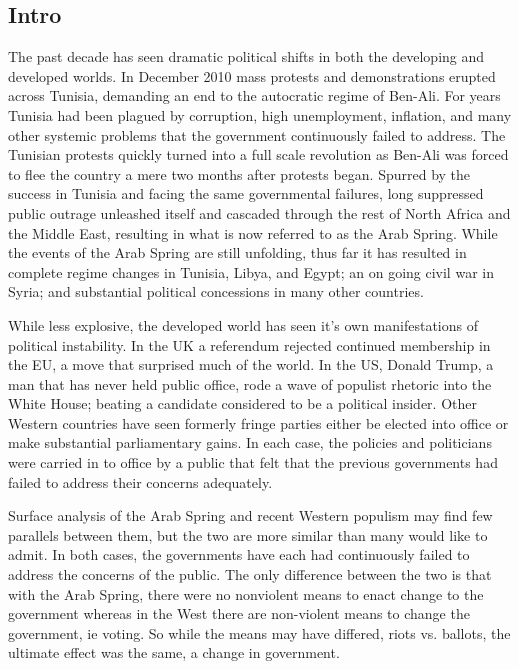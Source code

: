 \documentclass[12pt]{article}
\begin{document}
\begin{spacing}{1.5}


\section{Intro}

The past decade has seen dramatic political shifts in both the developing and developed worlds. In December 2010 mass protests and demonstrations erupted across Tunisia, demanding an end to the autocratic regime of Ben-Ali. For years Tunisia had been plagued by corruption, high unemployment, inflation, and many other systemic problems that the government continuously failed to address. The Tunisian protests quickly turned into a full scale revolution as Ben-Ali was forced to flee the country a mere two months after protests began. Spurred by the success in Tunisia and facing the same governmental failures, long suppressed public outrage unleashed itself and cascaded through the rest of North Africa and the Middle East, resulting in what is now referred to as the Arab Spring. While the events of the Arab Spring are still unfolding, thus far it has resulted in complete regime changes in Tunisia, Libya, and Egypt; an on going civil war in Syria; and substantial political concessions in many other countries.  

While less explosive, the developed world has seen it's own manifestations of political instability. In the UK a referendum rejected continued membership in the EU, a move that surprised much of the world. In the US, Donald Trump, a man that has never held public office, rode a wave of populist rhetoric into the White House; beating a candidate considered to be a political insider. Other Western countries have seen formerly fringe parties either be elected into office or make substantial parliamentary gains. In each case, the policies and politicians were carried in to office by a public that felt that the previous governments had failed to address their concerns adequately.

Surface analysis of the Arab Spring and recent Western populism may find few parallels between them, but the two are more similar than many would like to admit. In both cases, the governments have each had continuously failed to address the concerns of the public. The only difference between the two is that with the Arab Spring, there were no nonviolent means to enact change to the government whereas in the West there are non-violent means to change the government, ie voting. So while the means may have differed, riots vs. ballots, the ultimate effect was the same, a change in government.  


\end{spacing}
\end{document}
